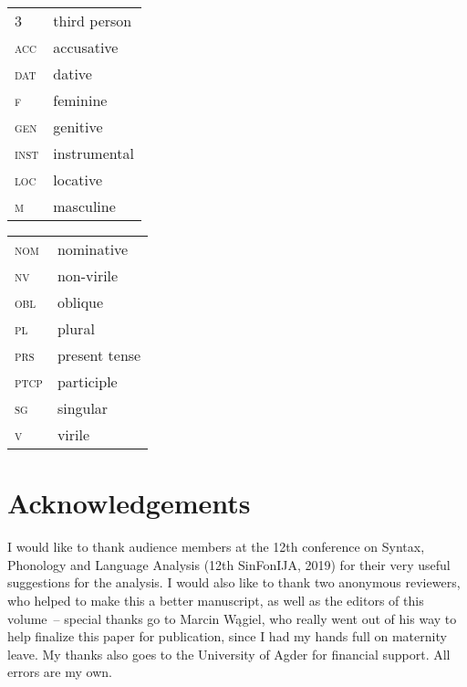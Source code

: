 \documentclass[output=paper]{langscibook}
\begin{document}
\begin{tabularx}{.5\textwidth}{@{}lX@{}}
\textsc{3}&third person\\
\textsc{acc}&{accusative}\\
\textsc{dat}&{dative}\\
\textsc{f}&{feminine}\\
\textsc{gen}&{genitive}\\
\textsc{inst}&{instrumental}\\
\textsc{loc}&{locative}\\
\textsc{m}&{masculine}\\
\end{tabularx}%
\begin{tabularx}{.5\textwidth}{@{}lX@{}}
\textsc{nom}&{nominative}\\
\textsc{nv}&{non-virile}\\
\textsc{obl}&{oblique}\\
\textsc{pl}&{plural}\\
\textsc{prs}&{present tense}\\
\textsc{ptcp}&{participle}\\
\textsc{sg}&singular\\
\textsc{v}&{virile}\\
\end{tabularx}

\section*{Acknowledgements}
I would like to thank audience members at the 12th conference on Syntax, Phonology and Language Analysis (12th SinFonIJA, 2019) for their very useful suggestions for the analysis. I would also like to thank two anonymous reviewers, who helped to make this a better manuscript, as well as the editors of this volume~-- special thanks go to Marcin Wągiel, who really went out of his way to help finalize this paper for publication, since I had my hands full on maternity leave. My thanks also goes to the University of Agder for financial support. All errors are my own.

{\sloppy\printbibliography[heading=subbibliography,notkeyword=this]}
\end{document}

